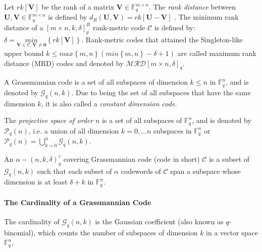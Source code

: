 Let $rk\left[\boldsymbol{V}\right]$ be the rank of a matrix $\boldsymbol{V}\in\ensuremath{\mathbb{F}}_{q}^{m\times n}$.
The \textit{rank distance} between $\boldsymbol{U},\boldsymbol{V}\in\ensuremath{\mathbb{F}}_{q}^{m\times n}$
is defined by $d_{R}\left(\boldsymbol{U},\boldsymbol{V}\right)=rk\left[\boldsymbol{U}-\boldsymbol{V}\right]$
\cite{Delsarte:1978,Gabidulin:1985,Roth:1991}. The minimum rank distance
of a $\left[m\times n,k,\delta\right]_{q}^{R}$ rank-metric code $\mathcal{C}$
is defined by: $\delta=\underset{\boldsymbol{V}\in\mathcal{C},\boldsymbol{V}\neq\boldsymbol{0}}{min}\left\{ rk\left[\boldsymbol{V}\right]\right\} $.
Rank-metric codes that attained the Singleton-like upper bound $k\leq max\left\{ m,n\right\} \left(min\left\{ m,n\right\} -\delta+1\right)$
\cite{Delsarte:1978,Gabidulin:1985,Roth:1991} are called maximum
rank distance (MRD) codes and denoted by $\mathcal{MRD}\left[m\times n,\delta\right]_{q}$.
\begin{defn}
 A Grassmannian code is a set of all subspaces of dimension $k\leq n$
in $\ensuremath{\mathbb{F}}_{q}^{n}$, and is denoted by $\mathcal{G}_{q}\left(n,k\right)$.
Due to being the set of all subspaces that have the same dimension
$k$, it is also called a \textit{constant dimension code}. \cite{Zhang:2019}
\end{defn}
%
\begin{defn}
 The \textit{projective space of order} $n$ is a set of all subspaces
of $\ensuremath{\mathbb{F}}_{q}^{n}$, and is denoted by $\mathcal{P}_{q}\left(n\right)$,
i.e. a union of all dimension $k=0,\ldots n$ subspaces in $\ensuremath{\mathbb{F}}_{q}^{n}$
or $\mathcal{P}_{q}\left(n\right)=\bigcup_{k=0}^{n}\mathcal{G}_{q}\left(n,k\right)$.
\cite{Wachter-Zeh:2018}
\end{defn}
%
\begin{defn}
 An $\alpha-\left(n,k,\delta\right)_{q}^{c}$ covering Grassmannian
code (code in short) $\mathcal{C}$ is a subset of $\mathcal{G}_{q}\left(n,k\right)$
such that each subset of $\alpha$ codewords of $\mathcal{C}$ span
a subspace whose dimension is at least $\delta+k$ in $\ensuremath{\mathbb{F}}_{q}^{n}$.
\cite{Zhang:2019}
\end{defn}

\paragraph{The Cardinality of a Grassmannian Code}

The cardinality of $\mathcal{G}_{q}\left(n,k\right)$ is the Gaussian
coefficient (also known as $q$-binomial), which counts the number
of subspaces of dimension $k$ in a vector space $\ensuremath{\mathbb{F}}_{q}^{n}$,

